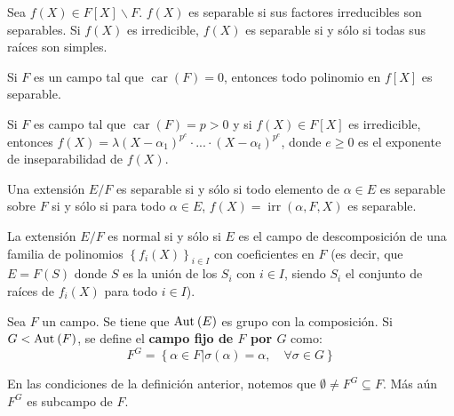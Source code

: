 \documentclass[12pt]{report}
\theoremstyle{largebreak}
\DeclareMathOperator{\car}{car}
\DeclareMathOperator{\irr}{irr}
\begin{document}
    \begin{obs}
        Sea $f(X)\in F[X]\backslash F$. $f(X)$ es separable si sus factores irreducibles son separables. Si $f(X)$ es irredicible, $f(X)$ es separable si y sólo si todas sus raíces son simples. 
    \end{obs}

    \begin{obs}
        Si $F$ es un campo tal que $\car(F)=0$, entonces todo polinomio en $f[X]$ es separable.
    \end{obs}

    \begin{obs}
        Si $F$ es campo tal que $\car(F)=p>0$ y si $f(X)\in F[X]$ es irredicible, entonces $f(X)=\lambda(X-\alpha_1)^{ p^e}\cdot...\cdot(X-\alpha_t)^{ p^e}$, donde $e\geq 0$ es el exponente de inseparabilidad de $f(X)$.
    \end{obs}

    \begin{obs}
        Una extensión $E/F$ es separable si y sólo si todo elemento de $\alpha\in E$ es separable sobre $F$ si y sólo si para todo $\alpha\in E$, $f(X)=\irr(\alpha,F,X)$ es separable.
    \end{obs}

    \begin{obs}
        La extensión $E/F$ es normal si y sólo si $E$ es el campo de descomposición de una familia de polinomios $\left\{f_i(X) \right\}_{i\in I}$ con coeficientes en $F$ (es decir, que $E=F(S)$ donde $S$ es la unión de los $S_i$ con $i\in I$, siendo $S_i$ el conjunto de raíces de $f_i(X)$ para todo $i\in I$).
    \end{obs}

\newcommand{\Aut}[2]{\ensuremath{\textup{Aut}_{#1}\left(#2\right)}}
\newcommand{\Gal}[1]{\ensuremath{\textup{Gal}\left(#1\right)}}


    \begin{mydef}
        Sea $F$ un campo. Se tiene que $\Aut{}{E}$ es grupo con la composición. Si $G<\Aut{}{F}$, se define el \textbf{campo fijo de $F$ por $G$} como:
        \begin{equation*}
            F^G=\left\{\alpha\in F\Big|\sigma(\alpha)=\alpha,\quad\forall \sigma\in G \right\}
        \end{equation*}
    \end{mydef}

    \begin{obs}
        En las condiciones de la definición anterior, notemos que $\emptyset\neq F^G\subseteq F$. Más aún $F^G$ es subcampo de $F$.
    \end{obs}
\end{document}
